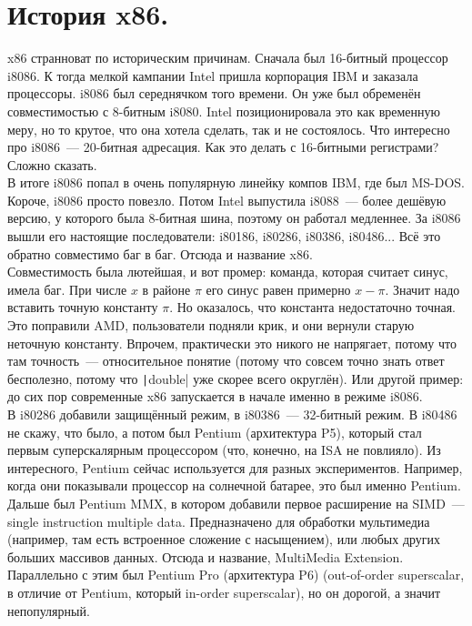 \documentclass{article}
\begin{document}
    \section{История x86.}
    x86 странноват по историческим причинам. Сначала был 16-битный процессор i8086. К тогда мелкой кампании Intel пришла корпорация IBM и заказала процессоры. i8086 был середнячком того времени. Он уже был обременён совместимостью с 8-битным i8080. Intel позиционировала это как временную меру, но то крутое, что она хотела сделать, так и не состоялось. Что интересно про i8086~--- 20-битная адресация. Как это делать с 16-битными регистрами? Сложно сказать.\\
    В итоге i8086 попал в очень популярную линейку компов IBM, где был MS-DOS. Короче, i8086 просто повезло. Потом Intel выпустила i8088~--- более дешёвую версию, у которого была 8-битная шина, поэтому он работал медленнее. За i8086 вышли его настоящие последователи: i80186, i80286, i80386, i80486... Всё это обратно совместимо баг в баг. Отсюда и название x86.\\
    Совместимость была лютейшая, и вот промер: команда, которая считает синус, имела баг. При числе $x$ в районе $\pi$ его синус равен примерно $x-\pi$. Значит надо вставить точную константу $\pi$. Но оказалось, что константа недостаточно точная. Это поправили AMD, пользователи подняли крик, и они вернули старую неточную константу. Впрочем, практически это никого не напрягает, потому что там точность~--- относительное понятие (потому что совсем точно знать ответ бесполезно, потому что \texttt|double| уже скорее всего округлён). Или другой пример: до сих пор современные x86 запускается в начале именно в режиме i8086.\\
    В i80286 добавили защищённый режим, в i80386~--- 32-битный режим. В i80486 не скажу, что было, а потом был Pentium (архитектура P5), который стал первым суперскалярным процессором (что, конечно, на ISA не повлияло). Из интересного, Pentium сейчас используется для разных экспериментов. Например, когда они показывали процессор на солнечной батарее, это был именно Pentium. Дальше был Pentium MMX, в котором добавили первое расширение на SIMD~--- single instruction multiple data. Предназначено для обработки мультимедиа (например, там есть встроенное сложение с насыщением), или любых других больших массивов данных. Отсюда и название, MultiMedia Extension. Параллельно с этим был Pentium Pro (архитектура P6) (out-of-order superscalar, в отличие от Pentium, который in-order superscalar), но он дорогой, а значит непопулярный.
\end{document}
